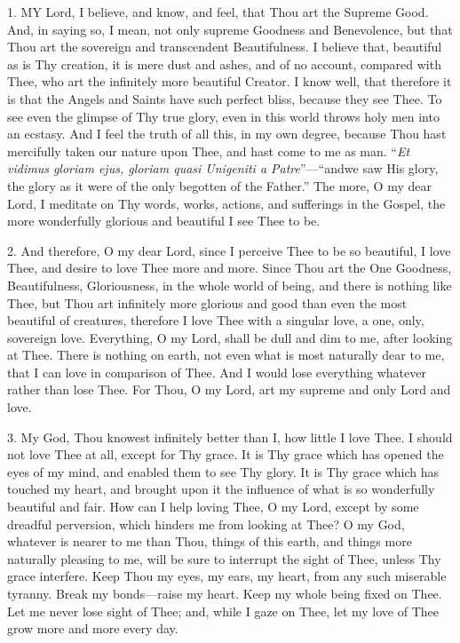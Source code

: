
1. MY
Lord, I believe, and know, and feel, that Thou art the Supreme Good.
And, in saying so, I mean, not only supreme Goodness and Benevolence,
but that Thou art the sovereign and transcendent Beautifulness. I
believe that, beautiful as is Thy creation, it is mere dust and ashes,
and of no account, compared with Thee, who art the infinitely more
beautiful Creator. I know well, that therefore it is that the Angels and
Saints have such perfect bliss, because they see Thee. To see even the
glimpse of Thy true glory, even in this world throws holy men into an
ecstasy. And I feel the truth of all this, in my own degree, because
Thou hast mercifully taken our nature upon Thee, and hast come to me as
man. ``\emph{Et vidimus gloriam ejus, gloriam quasi Unigeniti a Patre}''—``and\emph{}we saw His glory, the glory as it were of the only begotten of the
Father.'' The more, O my dear Lord, I meditate on Thy words, works,
actions, and sufferings in the Gospel, the more wonderfully glorious and
beautiful I see Thee to be.

2. And therefore, O my dear
Lord, since I perceive Thee to be so beautiful, I love Thee, and desire
to love Thee more and more. Since Thou art the One Goodness,
Beautifulness, Gloriousness, in the whole world of being, and there is
nothing like Thee, but Thou art infinitely more glorious and good than
even the most beautiful of creatures, therefore I love Thee with a
singular love, a one, only, sovereign love. Everything, O my Lord, shall
be dull and dim to me, after looking at Thee. There is nothing on earth,
not even what is most naturally dear to me, that I can love in
comparison of Thee. And I would lose everything whatever rather than
lose Thee. For Thou, O my Lord, art my supreme and only Lord and love.

3. My God, Thou knowest
infinitely better than I, how little I love Thee. I should not love Thee
at all, except for Thy grace. It is Thy grace which has opened the eyes
of my mind, and enabled them to see Thy glory. It is Thy grace which has
touched my heart, and brought upon it the influence of what is so
wonderfully beautiful and fair. How can I help loving Thee, O my Lord,
except by some dreadful perversion, which hinders me from looking at
Thee? O my God, whatever is nearer to me than Thou, things of this
earth, and things more naturally pleasing to me, will be sure to
interrupt the sight of Thee, unless Thy grace interfere. Keep Thou my
eyes, my ears, my heart, from any such miserable tyranny. Break my
bonds—raise my heart. Keep my whole being fixed on Thee. Let me never
lose sight of Thee; and, while I gaze on Thee, let my love of Thee grow
more and more every day.

